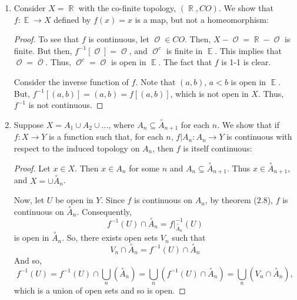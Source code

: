 \documentclass{book}
\DeclareMathOperator*{\R}{\mathbb{R}}
\DeclareMathOperator*{\E}{\mathbb{E}}
\DeclareMathOperator*{\Ocal}{\mathcal{O}}
\begin{document}
\begin{enumerate}[(1)]
    \item Consider $X = \R$ with the co-finite topology, $(\R, CO)$. We show that $f: \E \rightarrow  X$ defined by $f(x) = x$ is a map, but not a homeomorphism: 
        \begin{proof} To see that $f$ is continuous, let ${\Ocal} \in CO$. Then, $X - {\Ocal} = \R - {\Ocal}$ is finite. But then, $f^{-1}[{\Ocal}] = {\Ocal}$, and ${\Ocal}^c$ is finite in $\E$. This implies that ${\Ocal} = \overline{{\Ocal}}$. Thus, ${\Ocal}^c = {\Ocal}$ is open in $\E$. The fact that $f$ is 1-1 is clear. 
            \par Consider the inverse function of $f$. Note that $(a,b)$, $a < b$ is open in $\E$. But, $f^{-1}[(a,b)] = (a,b) = f[(a,b)]$, which is not open in $X$. Thus, $f^{-1}$ is not continuous.
        \end{proof}

    \item Suppose $X=A_1\cup A_2 \cup\dots$, where $A_n\subseteq\overset{\circ}{A}_{n+1}$ for each $n$.  We show that if $f:X\rightarrow Y$ is a function such that, for each $n$, $f|A_n:A_n\rightarrow Y$ is continuous with respect to the induced topology on $A_n$, then $f$ is itself continuous:
        \begin{proof} Let $x\in X$.  Then $x\in A_n$ for some $n$ and $A_n\subseteq \overset{\circ}{A}_{n+1}$.  Thus $x\in\overset{\circ}{A}_{n+1}$, and $X=\cup \overset{\circ}{A}_n$.
            \par Now, let $U$ be open in $Y$. Since $f$ is continuous on $A_n$, by theorem ($2.8$), $f$ is continuous on $\overset{\circ}{A}_n$. Consequently, 
            \[f^{-1}(U)\cap\overset{\circ}{A}_n=f|_{\overset{\circ}{A}_n}^{-1}(U)\] 
            is open in $\overset{\circ}{A}_n$. So, there exists open sets $V_n$ such that  \[V_n\cap\overset{\circ}{A}_n=f^{-1}(U)\cap\overset{\circ}{A}_n\]
            And so, 
            \[f^{-1}(U) =f^{-1}(U)\cap \bigcup_n(\overset{\circ}{A}_n)=\bigcup_n(f^{-1}(U)\cap \overset{\circ}{A}_n)=\bigcup_n(V_n\cap \overset{\circ}{A}_n),\]
            which is a union of open sets and so is open.
        \end{proof}


\end{enumerate}
\end{document}
